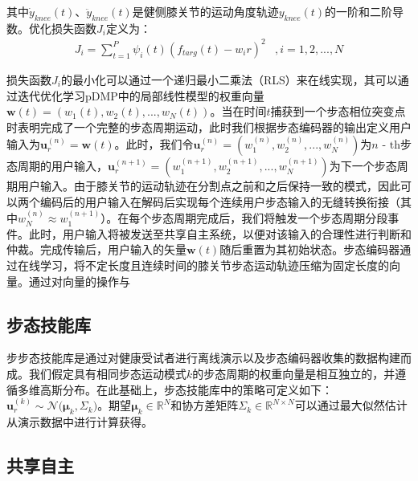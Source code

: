 其中${\dot y_{knee}}(t)$、${\ddot y_{knee}}(t)$是健侧膝关节的运动角度轨迹${y_{knee}}(t)$的一阶和二阶导数。优化损失函数${J_i}$定义为：
\begin{equation}
  \label{deqn_ex12}
  \begin{array}{*{20}{c}}
    {{J_i} = \sum\limits_{t = 1}^P {{\psi _i}} (t){{\left( {{f_{targ}}(t) - {w_i}r} \right)}^2}}&{,i = 1,2,...,N} 
  \end{array}
\end{equation}       

损失函数${J_i}$的最小化可以通过一个递归最小二乘法（RLS）来在线实现，其可以通过迭代优化学习pDMP中的局部线性模型的权重向量$\pmb{w}(t)=({w_1}(t),{w_2}(t),...,{w_N}(t))$。当在时间$t$捕获到一个步态相位突变点时表明完成了一个完整的步态周期运动，此时我们根据步态编码器的输出定义用户输入为$\pmb{u}_r^{(n)} = \pmb{w}(t)$。此时，我们令$\pmb{u}_r^{(n)} = (w_1^{(n)},w_2^{(n)},...,w_N^{(n)})$为$n{\text{ - th}}$步态周期的用户输入，$\pmb{u}_r^{(n + 1)} = (w_1^{(n + 1)},w_2^{(n + 1)},...,w_N^{(n + 1)})$为下一个步态周期用户输入。由于膝关节的运动轨迹在分割点之前和之后保持一致的模式，因此可以两个编码后的用户输入在解码后实现每个连续用户步态输入的无缝转换衔接（其中$w_N^{(n)}\approx w_1^{(n+1)}$）。在每个步态周期完成后，我们将触发一个步态周期分段事件。此时，用户输入将被发送至共享自主系统，以便对该输入的合理性进行判断和仲裁。完成传输后，用户输入的矢量$\pmb{w}(t)$随后重置为其初始状态。步态编码器通过在线学习，将不定长度且连续时间的膝关节步态运动轨迹压缩为固定长度的向量。通过对向量的操作与

\subsection{步态技能库}步步态技能库是通过对健康受试者进行离线演示以及步态编码器收集的数据构建而成。我们假定具有相同步态运动模式$ k $的步态周期的权重向量是相互独立的，并遵循多维高斯分布。在此基础上，步态技能库中的策略可定义如下：$\pmb{u}_r^{(k)}\sim {\mathcal{N}}\pmb{(}{{\pmb{\mu }}_k},{\Sigma _k}\pmb{)}$。期望${{\pmb{\mu }}_k} \in {\mathbb{R}^N}$和协方差矩阵${\Sigma _k} \in {\mathbb{R}^{N \times N}}$可以通过最大似然估计从演示数据中进行计算获得。  
\subsection{共享自主}
